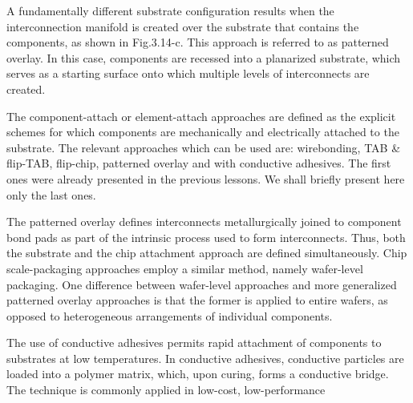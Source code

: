 \begin{spacing}{1.5}
A fundamentally different substrate configuration results when the interconnection manifold is created over the substrate that contains the components, as shown in Fig.3.14-c. This approach is referred to as patterned overlay. In this case, components are recessed into a planarized substrate, which serves as a starting surface onto which multiple levels of interconnects are created. 

The component-attach or element-attach approaches are defined as the explicit schemes for which components are mechanically and electrically attached to the substrate. The relevant approaches which can be used are: wirebonding, TAB \& flip-TAB, flip-chip, patterned overlay and with conductive adhesives. The first ones were already presented in the previous lessons. We shall briefly present here only the last ones.

The patterned overlay defines interconnects metallurgically joined to component bond pads as part of the intrinsic process used to form interconnects. Thus, both the substrate and the chip attachment approach are defined simultaneously. Chip scale-packaging approaches employ a similar method, namely wafer-level packaging. One difference between wafer-level approaches and more generalized patterned overlay approaches is that the former is applied to entire wafers, as opposed to heterogeneous arrangements of individual components. 

The use of conductive adhesives permits rapid attachment of components to substrates at low temperatures. In conductive adhesives, conductive particles are loaded into a polymer matrix, which, upon curing, forms a conductive bridge. The technique is commonly applied in low-cost, low-performance

\end{spacing}
\newpage
